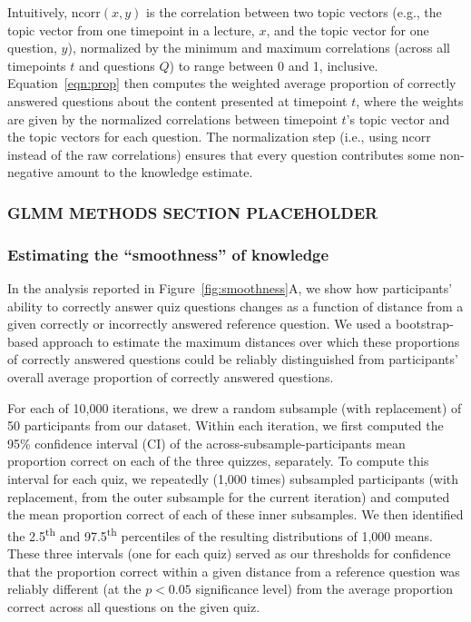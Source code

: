 \documentclass[10pt]{article}
\begin{document}
Intuitively, $\mathrm{ncorr}(x, y)$ is the correlation between two topic
vectors (e.g., the topic vector from one timepoint in a lecture, $x$, and the
topic vector for one question, $y$), normalized by the minimum and maximum
correlations (across all timepoints $t$ and questions $Q$) to range between 0
and 1, inclusive. Equation~\ref{eqn:prop} then computes the weighted average
proportion of correctly answered questions about the content presented at
timepoint $t$, where the weights are given by the normalized correlations
between timepoint $t$'s topic vector and the topic vectors for each question.
The normalization step (i.e., using $\mathrm{ncorr}$ instead of the raw
correlations) ensures that every question contributes some non-negative amount
to the knowledge estimate.

\subsubsection*{GLMM METHODS SECTION PLACEHOLDER}\label{subsec:glmm}

\subsubsection*{Estimating the ``smoothness'' of knowledge}\label{subsec:smoothness}

In the analysis reported in Figure~\ref{fig:smoothness}A, we show how
participants' ability to correctly answer quiz questions changes as a function
of distance from a given correctly or incorrectly answered reference question.
We used a bootstrap-based approach to estimate the maximum distances over which
these proportions of correctly answered questions could be reliably
distinguished from participants' overall average proportion of correctly
answered questions.

For each of 10,000 iterations, we drew a random subsample (with replacement) of
50 participants from our dataset. Within each iteration, we first computed the
95\% confidence interval (CI) of the across-subsample-participants mean
proportion correct on each of the three quizzes, separately. To compute this
interval for each quiz, we repeatedly (1,000 times) subsampled participants
(with replacement, from the outer subsample for the current iteration) and
computed the mean proportion correct of each of these inner subsamples. We then
identified the 2.5\textsuperscript{th} and 97.5\textsuperscript{th} percentiles
of the resulting distributions of 1,000 means. These three intervals (one for
each quiz) served as our thresholds for confidence that the proportion correct
within a given distance from a reference question was reliably different (at
the $p < 0.05$ significance level) from the average proportion correct across
all questions on the given quiz.
\end{document}
